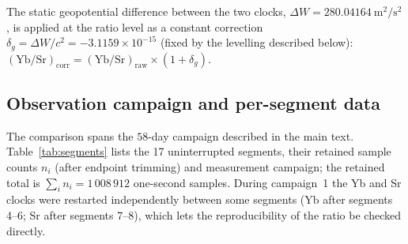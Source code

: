 \documentclass[11pt,a4paper]{article}
\newcommand{\dW}{\Delta W}
\newcommand{\e}[1]{\times 10^{#1}}
\begin{document}
The static geopotential difference between the two clocks,
$\dW = 280.04164\ \mathrm{m^{2}/s^{2}}$, is applied at the ratio level as a
constant correction $\delta_g = \dW/c^{2} = -3.1159\e{-15}$ (fixed by the
levelling described below):
$\mathrm{(Yb/Sr)}_{\mathrm{corr}} = \mathrm{(Yb/Sr)}_{\mathrm{raw}}
\times (1+\delta_g)$.



\subsection{Observation campaign and per-segment data}
\label{app:segments}

The comparison spans the $58$-day campaign described in the main text.
Table~\ref{tab:segments} lists the 17 uninterrupted segments, their
retained sample counts $n_i$ (after endpoint trimming) and measurement
campaign; the retained total is $\sum_i n_i = 1\,008\,912$ one-second
samples. During campaign~1 the Yb and Sr clocks were restarted
independently between some segments (Yb after segments 4--6; Sr after
segments 7--8), which lets the reproducibility of the ratio be checked
directly.
\end{document}
